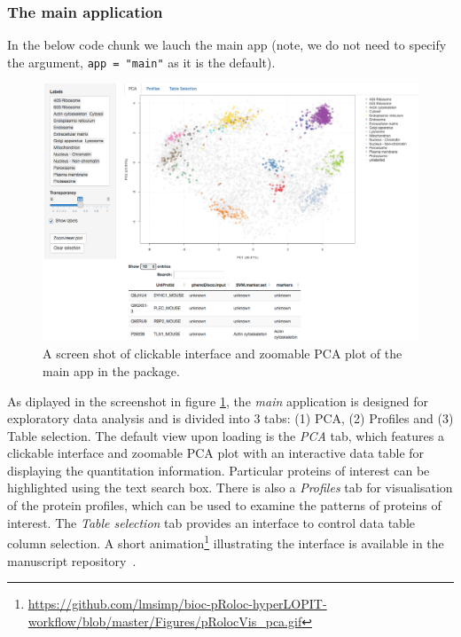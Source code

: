 \subsubsection*{The main application}
In the below code chunk we lauch the main
app (note, we do not need to specify the argument, \texttt{app =
  "main"} as it is the default).

\begin{knitrout}
\color{fgcolor}\begin{kframe}
\begin{alltt}
\hlstd{(}\hlstd{)}
\end{alltt}
\end{kframe}
\end{knitrout}

\begin{figure}[!ht]
  \centering
  \includegraphics[width=\textwidth]{./Figures/mainapp.png}
  \caption{A screen shot of clickable interface and zoomable PCA plot
    of the main app in the  package. }
  \label{fig:app}
\end{figure}

As diplayed in the screenshot in figure \ref{fig:app}, the
\textit{main} application is designed for exploratory data analysis
and is divided into 3 tabs: (1) PCA, (2) Profiles and (3) Table
selection. The default view upon loading is the \textit{PCA} tab,
which features a clickable interface and zoomable PCA plot with an
interactive data table for displaying the quantitation information.
Particular proteins of interest can be highlighted using the text
search box. There is also a \textit{Profiles} tab for visualisation of
the protein profiles, which can be used to examine the patterns of
proteins of interest. The \textit{Table selection} tab provides an
interface to control data table column selection. A short
animation\footnote{\url{https://github.com/lmsimp/bioc-pRoloc-hyperLOPIT-workflow/blob/master/Figures/pRolocVis\_pca.gif}}
illustrating the interface is available in the manuscript
repository~\cite{ghrepo}.


